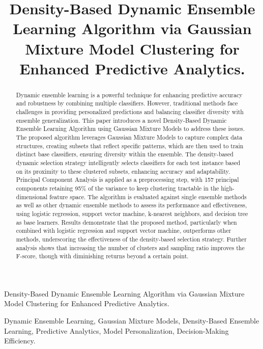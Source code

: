 \documentclass[lettersize,journal]{IEEEtran}
\begin{document}
	\title{Density-Based Dynamic Ensemble Learning Algorithm via Gaussian Mixture Model Clustering for Enhanced Predictive Analytics.}
	\author{}
	
	{Density-Based Dynamic Ensemble Learning Algorithm via Gaussian Mixture Model Clustering for Enhanced Predictive Analytics.}
	
	\maketitle
	\begin{abstract}
		 Dynamic ensemble learning is a powerful technique for enhancing predictive accuracy and robustness by combining multiple classifiers. However, traditional methods face challenges in providing personalized predictions and balancing classifier diversity with ensemble generalization.
		 This paper introduces a novel Density-Based Dynamic Ensemble Learning Algorithm using Gaussian Mixture Models to address these issues. The proposed algorithm leverages Gaussian Mixture Models to capture complex data structures, creating subsets that reflect specific patterns, which are then used to train distinct base classifiers, ensuring diversity within the ensemble. The density-based dynamic selection strategy intelligently selects classifiers for each test instance based on its proximity to these clustered subsets, enhancing accuracy and adaptability. Principal Component Analysis is applied as a preprocessing step, with 157 principal components retaining 95\% of the variance to keep clustering tractable in the high-dimensional feature space. The algorithm is evaluated against single ensemble methods as well as other dynamic ensemble methods to assess its performance and effectiveness, using logistic regression, support vector machine, k-nearest neighbors, and decision tree as base learners. Results demonstrate that the proposed method, particularly when combined with logistic regression and support vector machine, outperforms other methods, underscoring the effectiveness of the density-based selection strategy. Further analysis shows that increasing the number of clusters and sampling ratio improves the F-score, though with diminishing returns beyond a certain point.
	\end{abstract}
	
	\begin{IEEEkeywords}
		Dynamic Ensemble Learning, Gaussian Mixture Models, Density-Based Ensemble Learning, Predictive Analytics, Model Personalization, Decision-Making Efficiency.
	\end{IEEEkeywords}
	
\end{document}
